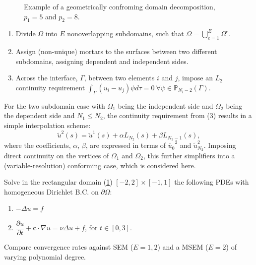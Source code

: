 \documentclass[final,t]{beamer}
\begin{document}
\begin{frame}[fragile]{}
\begin{columns}[t]
\begin{column}{.45\linewidth}
\begin{tcolorbox}[toplevelbox,adjusted title=Approach]
\begin{figure}
\caption{\label{fig:domaindecomp} Example of a geometrically confroming domain decomposition, $p_1 = 5$ and $p_2 = 8$.}
      \end{figure}
\begin{enumerate}
\def\labelenumi{\arabic{enumi}.}
\item
  Divide \(\Omega\) into \(E\) nonoverlapping subdomains, such that
  \(\Omega=\bigcup_{e=1}^{E} \Omega ^e\).
\item
  Assign (non-unique) mortars to the surfaces between two different subdomains, assigning dependent and independent sides.
\item
  Across the interface, \(\Gamma\), between two elements \(i\) and
  \(j\), impose an \(L_2\) continuity requirement
  \(\int_{\Gamma}(u_i-u_j)\psi d\tau = 0\ \forall \psi \in \mathbb{P}_{N_i-2}(\Gamma)\).
\end{enumerate}

For the two subdomain case with \(\Omega_1\) being the independent side and \(\Omega_2\)
being the dependent side and $N_1 \le N_2$, the continuity requirement from (3) results
in a simple interpolation scheme:
\begin{equation}
\tilde{u}^2(s) = \tilde{u}^1(s) + \alpha L_{N_2}(s) + \beta L_{N_2-1}(s) \nonumber ,
\end{equation}
where the coefficients, $\alpha$, $\beta$, are expressed in terms of $\tilde{u_0}^2$ and
$\tilde{u}_{N_2}^2$. Imposing direct continuity on the vertices of $\Omega_1$ and $\Omega_2$,
this further simplifiers into a (variable-resolution) conforming case, which is considered here.

      \end{tcolorbox}

      \begin{tcolorbox}[toplevelbox,adjusted title= Test Cases]
      Solve in the rectangular domain (\ref{fig:domaindecomp}) $[-2,2]\times[-1,1]$
      the following PDEs with homogeneous Dirichlet B.C. on $\partial\Omega$:
\begin{enumerate}
\item
$-\Delta u = f$
\item
$\dfrac{\partial u}{\partial t} + \boldsymbol{c} \cdot \nabla u = \nu \Delta u +f$, for $t\in[0,3]$.
\end{enumerate}
      Compare convergence rates against SEM ($E=1,2$)
      and a MSEM ($E=2$) of varying polynomial degree.
      \end{tcolorbox}
    \end{column}


\end{columns}
\end{frame}
\end{document}
